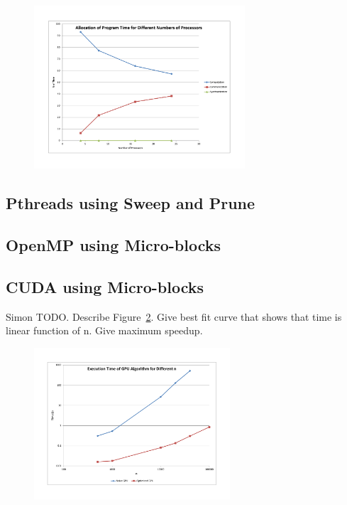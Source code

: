 \documentclass[11pt]{article} %
\begin{document}
\begin{figure}[!h]
\centering
\includegraphics*[width=0.7\textwidth, viewport= 70 70 730 550]{figures/mpips_timealloc_vs_p}
\caption{}
\label{mpips_timealloc_vs_p}
\end{figure}

\subsection{Pthreads using Sweep and Prune}

\subsection{OpenMP using Micro-blocks}

\subsection{CUDA using Micro-blocks}

Simon TODO. Describe Figure~\ref{gpu_time_vs_n}. Give best fit curve that shows that time is linear function of n. Give maximum speedup.

\begin{figure}[!h]
\centering
\includegraphics*[width=0.65\textwidth, viewport= 70 70 730 550]{figures/gpu_time_vs_n}
\caption{}
\label{gpu_time_vs_n}
\end{figure}
\end{document}
